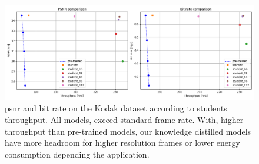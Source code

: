 \documentclass{article}
\begin{document}
\begin{figure}
    \centering
    \includegraphics[width=15cm]{kd_lic_fps.png}
    \caption[\acrshort{psnr} and bit rate on the Kodak dataset according to students' throughput.]{\acrshort{psnr} and bit rate on the Kodak dataset according to students throughput. All models, exceed standard frame rate. With, higher throughput than pre-trained models, our knowledge distilled models have more headroom for higher resolution frames or lower energy consumption depending the application.}
    \label{kd_lic_fps}
\end{figure}

\end{document}
